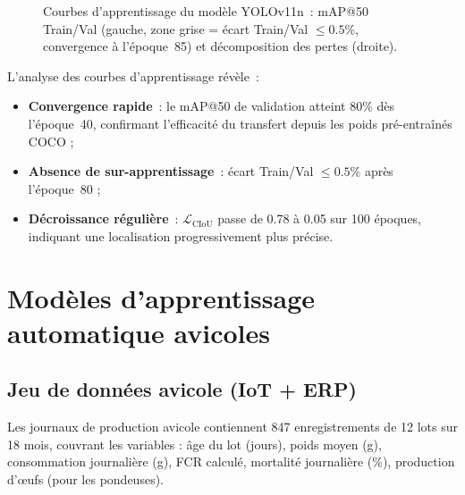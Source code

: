 \begin{figure}[H]
{%
}
\caption[Courbes d'apprentissage YOLOv11n]{Courbes d'apprentissage du modèle YOLOv11n~: mAP@50 Train/Val
(gauche, zone grise = écart Train/Val $\leq 0.5\%$, convergence à l'époque~85)
et décomposition des pertes (droite).}
\label{fig:train_curves}
\end{figure}

L'analyse des courbes d'apprentissage révèle~:
\begin{itemize}
  \item \textbf{Convergence rapide}~: le mAP@50 de validation atteint 80\% dès
        l'époque~40, confirmant l'efficacité du transfert depuis les poids pré-entraînés COCO ;
  \item \textbf{Absence de sur-apprentissage}~: écart Train/Val $\leq 0.5\%$ après
        l'époque~80 ;
  \item \textbf{Décroissance régulière}~: $\mathcal{L}_\text{CIoU}$ passe de 0.78
        à 0.05 sur 100 époques, indiquant une localisation progressivement plus précise.
\end{itemize}

\section{Modèles d'apprentissage automatique avicoles}
\label{sec:avicole_models}

\subsection{Jeu de données avicole (IoT + ERP)}

Les journaux de production avicole contiennent 847 enregistrements de 12 lots
sur 18 mois, couvrant les variables : âge du lot (jours), poids moyen (g),
consommation journalière (g), FCR calculé, mortalité journalière (\%), production
d'œufs (pour les pondeuses).

